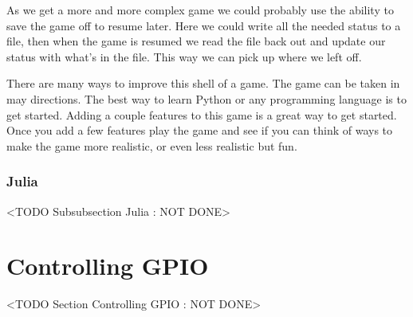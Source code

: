 As we get a more and more complex game we could probably use the ability to save the game off to resume later. Here we could write all the needed status to a file, then when the game is resumed we read the file back out and update our status with what's in the file. This way we can pick up where we left off. 

There are many ways to improve this shell of a game. The game can be taken in may directions. The best way to learn Python or any programming language is to get started. Adding a couple features to this game is a great way to get started. Once you add a few features play the game and see if you can think of ways to make the game more realistic, or even less realistic but fun.

\subsubsection{Julia}
	<TODO Subsubsection  Julia : NOT DONE>

\section{Controlling GPIO}
	<TODO Section Controlling GPIO : NOT DONE>

